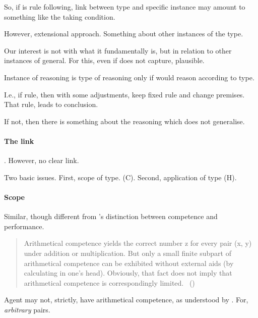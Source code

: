 \begin{note}
  So, if \tor{} is rule following, link between type and specific instance may amount to something like the taking condition.

  However, extensional approach.
  Something about other instances of the type.

  Our interest is not with what it fundamentally is, but in relation to other instances of general.
  For this, even if does not capture, plausible.

  \begin{suggestion}
    Instance of reasoning is type of reasoning only if would reason according to type.
  \end{suggestion}

  I.e., if rule, then with some adjustments, keep fixed rule and change premises.
  That rule, leads to conclusion.

  If not, then there is something about the reasoning which does not generalise.
\end{note}

\paragraph{The link}

\begin{note}
  .
  However, no clear link.

  Two basic issues.
  First, scope of type. (C).
  Second, application of type (H).
\end{note}

\paragraph{Scope}

\begin{note}
  Similar, though different from \citeauthor{Chomsky:2015aa}'s distinction between competence and performance.

  \begin{quote}
    Arithmetical competence yields the correct number z for every pair (x, y) under addition or multiplication.
    But only a small finite subpart of arithmetical competence can be exhibited without external aids (by calculating in one's head).
    Obviously, that fact does not imply that arithmetical competence is correspondingly limited.\newline
    \mbox{ }\hfill\mbox{(\citeyear[xii]{Chomsky:2015aa})}
  \end{quote}

  Agent may not, strictly, have arithmetical competence, as understood by \citeauthor{Chomsky:2015aa}.
  For, \emph{arbitrary} pairs.
\end{note}


